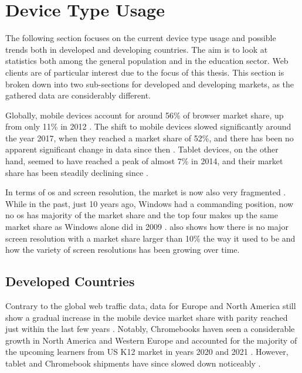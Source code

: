 \section{Device Type Usage}
\label{sec:device-types}

The following section focuses on the current device type usage and possible trends both in developed and developing countries.
The aim is to look at statistics both among the general population and in the education sector.
Web clients are of particular interest due to the focus of this thesis.
This section is broken down into two sub-sections for developed and developing markets, as the gathered data are considerably different.

Globally, mobile devices account for around 56\% of browser market share, up from only 11\% in 2012 \parencite{StatCounter_2023}.
The shift to mobile devices slowed significantly around the year 2017, when they reached a market share of 52\%, and there has been no apparent significant change in data since then \parencite{StatCounter_2023}.
Tablet devices, on the other hand, seemed to have reached a peak of almost 7\% in 2014, and their market share has been steadily declining since \parencite{StatCounter_2023}.

In terms of \gls{os} and screen resolution, the market is now also very fragmented \parencites{StatCounter_OS_2023}{StatCounter_Resolution_2023}.
While in the past, just 10 years ago, Windows had a commanding position, now no \gls{os} has majority of the market share and the top four makes up the same market share as Windows alone did in 2009 \parencite{StatCounter_OS_2023}.
\textcite{StatCounter_Resolution_2023} also shows how there is no major screen resolution with a market share larger than 10\% the way it used to be and how the variety of screen resolutions has been growing over time.

\subsection{Developed Countries}

Contrary to the global web traffic data, data for Europe and North America still show a gradual increase in the mobile device market share with parity reached just within the last few years \parencites{StatCounter_Europe_2023}{StatCounter_NorthAmerica_2023}.
Notably, Chromebooks haven seen a considerable growth in North America and Western Europe and accounted for the majority of the upcoming learners from US K12 market in years 2020 and 2021 \parencite{Boreham_2019, IDC_2021}.
However, tablet and Chromebook shipments have since slowed down noticeably \parencite{IDC_2022}.

